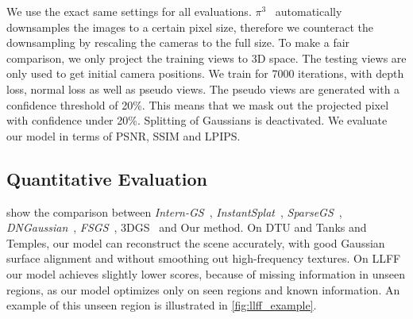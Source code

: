 We use the exact same settings for all evaluations. $\pi^3$~\cite{wang2025pi3} automatically downsamples the images to a certain pixel size, therefore we counteract the downsampling by rescaling the cameras to the full size. To make a fair comparison, we only project the training views to 3D space. The testing views are only used to get initial camera positions.
We train for 7000 iterations, with depth loss, normal loss as well as pseudo views. The pseudo views are generated with a confidence threshold of 20\%. This means that we mask out the projected pixel with confidence under 20\%. Splitting of Gaussians is deactivated.
We evaluate our model in terms of PSNR, SSIM and LPIPS.%

\subsection{Quantitative Evaluation}
 show the comparison between \textit{Intern-GS}~\cite{InternGS}, \textit{InstantSplat}~\cite{InstantSplat}, \textit{SparseGS}~\cite{SparseGS}, \textit{DNGaussian}~\cite{DNGaussian}, \textit{FSGS}~\cite{fsgs}, 3DGS~\cite{3dgs2023} and Our method. On DTU and Tanks and Temples, our model can reconstruct the scene accurately, with good Gaussian surface alignment and without smoothing out high-frequency textures. On LLFF our model achieves slightly lower scores, because of missing information in unseen regions, as our model optimizes only on seen regions and known information. An example of this unseen region is illustrated in \cref{fig:llff_example}.

